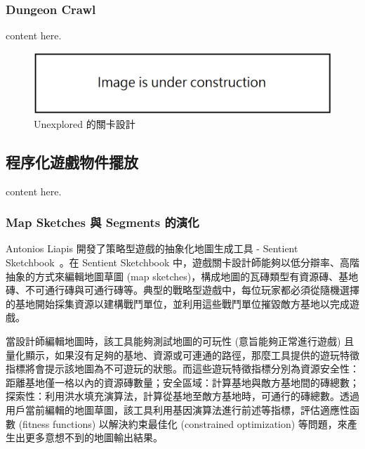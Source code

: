 \subsubsection{Dungeon Crawl}
\label{sssec:relatedworks-proceduralmission-dungeoncrawl}

content here.

\begin{figure}[ht]
  \begin{center}
    \includegraphics[width=1.0\textwidth]{figures/under_construction.png}
    \caption{Unexplored 的關卡設計} 
    \label{fig:unexplored}
  \end{center}
\end{figure}

\subsection{程序化遊戲物件擺放}
\label{ssec:relatedworks-proceduralgamepatterns}

content here.

\subsubsection{Map Sketches 與 Segments 的演化}
\label{sssec:relatedworks-proceduralgamepatterns-mapsketches}

Antonios Liapis 開發了策略型遊戲的抽象化地圖生成工具 - Sentient Sketchbook~\cite{liapis2013generating}。在 Sentient Sketchbook 中，遊戲關卡設計師能夠以低分辯率、高階抽象的方式來編輯地圖草圖 (map sketches)，構成地圖的瓦磚類型有資源磚、基地磚、不可通行磚與可通行磚等。典型的戰略型遊戲中，每位玩家都必須從隨機選擇的基地開始採集資源以建構戰鬥單位，並利用這些戰鬥單位摧毀敵方基地以完成遊戲。

當設計師編輯地圖時，該工具能夠測試地圖的可玩性 (意旨能夠正常進行遊戲) 且量化顯示，如果沒有足夠的基地、資源或可連通的路徑，那麼工具提供的遊玩特徵指標將會提示該地圖為不可遊玩的狀態。而這些遊玩特徵指標分別為資源安全性：距離基地僅一格以內的資源磚數量；安全區域：計算基地與敵方基地間的磚總數；探索性：利用洪水填充演算法，計算從基地至敵方基地時，可通行的磚總數。透過用戶當前編輯的地圖草圖，該工具利用基因演算法進行前述等指標，評估適應性函數 (fitness functions) 以解決約束最佳化 (constrained optimization) 等問題，來產生出更多意想不到的地圖輸出結果。

